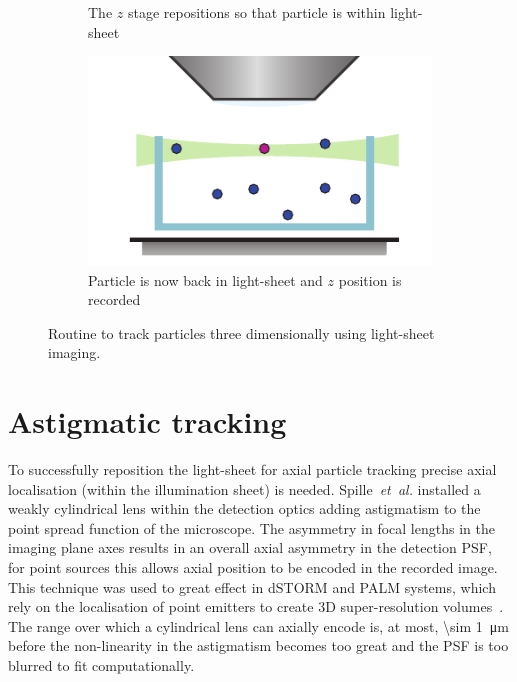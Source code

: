 \begin{figure}
\begin{subfigure}[t]{0.45\linewidth}
		\caption{The \(z\) stage repositions so that particle is within light-sheet}\label{fig:SPIMSPT3}
	\end{subfigure}\quad
	\begin{subfigure}[t]{0.45\linewidth}
		\centering
		\includegraphics{Chapters/spt/Figs/PDF/tracking/4_piezo_track}
		\caption{Particle is now back in light-sheet and \(z\) position is recorded}\label{fig:SPIMSPT4}
	\end{subfigure}
	\caption{Routine to track particles three dimensionally using light-sheet imaging.}\label{fig:SPIMSPT}
\end{figure}

\section{Astigmatic tracking}

To successfully reposition the light-sheet for axial particle tracking %
precise axial localisation (within the illumination sheet) is needed.
Spille~\emph{et~al.} installed a weakly cylindrical lens within the detection optics adding astigmatism to the point spread function of the microscope.
The asymmetry in focal lengths
in the imaging plane axes %
results in an overall axial asymmetry in the detection \gls{PSF}, for point sources this allows axial position to be encoded in the recorded image.
This technique was used to great effect in \gls{dSTORM} and PALM systems, which rely on the localisation of point emitters to create \gls{3D} \gls{super-resolution} volumes~\cite{huangThreeDimensionalSuperResolutionImaging2008}.
The range over which a cylindrical lens can axially encode is, at most, \SI{\sim 1}{\micro\metre} before the non-linearity in the astigmatism becomes too great and the \gls{PSF} is too blurred to fit computationally.

